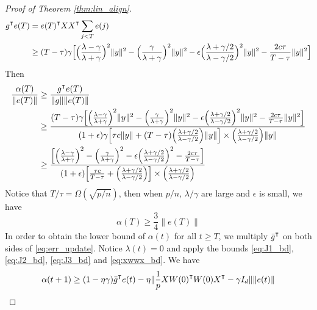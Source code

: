 \begin{proof}[Proof of Theorem \ref{thm:lin_align}]
\begin{equation*}
\begin{aligned}
    g\transpose e(T) 
    &= e(T)\transpose XX\transpose \sum_{j<T}e(j) \\
    &\geq (T-\tau)\gamma\Big[\Big(\frac{\lambda-\gamma}{\lambda+\gamma}\Big)^2\|y\|^2-\Big(\frac{\gamma}{\lambda+\gamma}\Big)^2\|y\|^2-\epsilon\Big(\frac{\lambda+\gamma/2}{\lambda-\gamma/2}\Big)^2\|y\|^2- \frac{2c\tau}{T-\tau}\|y\|^2\Big] 
\end{aligned}
\end{equation*}
Then
\begin{equation*}
\begin{aligned}
\frac{\alpha(T)}{\|e(T)\|} &\geq \frac{g\transpose e(T)}{\|g\|\|e(T)\|} \\
&\geq \frac{(T-\tau)\gamma\Big[\Big(\frac{\lambda-\gamma}{\lambda+\gamma}\Big)^2\|y\|^2-\Big(\frac{\gamma}{\lambda+\gamma}\Big)^2\|y\|^2-\epsilon\Big(\frac{\lambda+\gamma/2}{\lambda-\gamma/2}\Big)^2\|y\|^2- \frac{2c\tau}{T-\tau}\|y\|^2\Big]}{(1+\epsilon)\gamma\Big[\tau c\|y\|+ (T-\tau)\Big(\frac{\lambda+\gamma/2}{\lambda-\gamma/2}\Big)\|y\|\Big]\times\Big(\frac{\lambda+\gamma/2}{\lambda-\gamma/2}\Big)\|y\|} \\
&\geq \frac{\Big[\Big(\frac{\lambda-\gamma}{\lambda+\gamma}\Big)^2-\Big(\frac{\gamma}{\lambda+\gamma}\Big)^2-\epsilon\Big(\frac{\lambda+\gamma/2}{\lambda-\gamma/2}\Big)^2- \frac{2c\tau}{T-\tau}\Big]}{(1+\epsilon)\Big[\frac{\tau c}{T-\tau}+ \Big(\frac{\lambda+\gamma/2}{\lambda-\gamma/2}\Big)\Big]\times\Big(\frac{\lambda+\gamma/2}{\lambda-\gamma/2}\Big)} \\
\end{aligned}
\end{equation*}
Notice that $T/\tau = \Omega(\sqrt{p/n})$, then when $p/n$, $\lambda/\gamma$ are large and $\epsilon$ is small, we have
\begin{equation}
\label{eq:alphaT_eT}
    \alpha(T)\geq \frac{3}{4}\|e(T)\|
\end{equation}
In order to obtain the lower bound of $\alpha(t)$ for all $t\geq T$, we multiply $\bar{g}\transpose$ on both sides of \eqref{eq:err_update}. Notice $\lambda(t) = 0$ and apply the bounds \eqref{eq:J1_bd}, \eqref{eq:J2_bd}, \eqref{eq:J3_bd} and \eqref{eq:xwwx_bd}. We have
\begin{equation*}
\begin{aligned}
    \alpha(t+1)
    &\geq (1-\eta\gamma)\bar{g}\transpose e(t) - \eta\|\frac{1}{p}XW(0)\transpose W(0)X\transpose-\gamma I_d\|\|e(t)\|\\

\end{aligned}
\end{equation*}
\end{proof}
